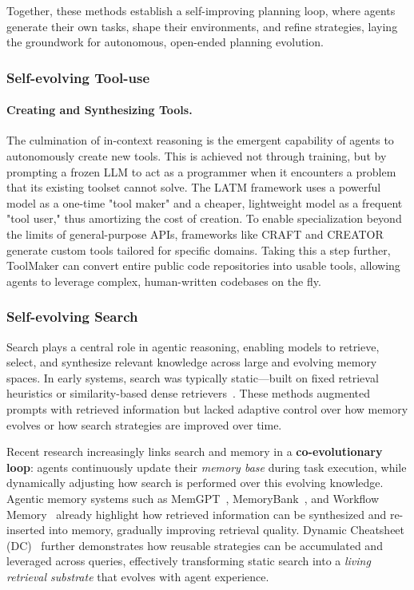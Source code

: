 Together, these methods establish a self-improving planning loop, where agents generate their own tasks, shape their environments, and refine strategies, laying the groundwork for autonomous, open-ended planning evolution.

\subsubsection{Self-evolving Tool-use}

\paragraph{Creating and Synthesizing Tools.}
The culmination of in-context reasoning is the emergent capability of agents to autonomously create new tools. This is achieved not through training, but by prompting a frozen LLM to act as a programmer when it encounters a problem that its existing toolset cannot solve.
The LATM framework \cite{cai2024large} uses a powerful model as a one-time "tool maker" and a cheaper, lightweight model as a frequent "tool user," thus amortizing the cost of creation. 
To enable specialization beyond the limits of general-purpose APIs, frameworks like CRAFT \cite{yuan2024craft} and CREATOR \cite{qian-etal-2023-creator} generate custom tools tailored for specific domains. Taking this a step further, ToolMaker \cite{wölflein2025llmagentsmakingagent} can convert entire public code repositories into usable tools, allowing agents to leverage complex, human-written codebases on the fly.



\subsubsection{Self-evolving Search}

Search plays a central role in agentic reasoning, enabling models to retrieve, select, and synthesize relevant knowledge across large and evolving memory spaces. In early systems, search was typically static—built on fixed retrieval heuristics or similarity-based dense retrievers~\cite{lewis2020retrieval,asai2023self,Zhong2023MemoryBankEL,Packer2023MemGPTTL}. These methods augmented prompts with retrieved information but lacked adaptive control over how memory evolves or how search strategies are improved over time.

Recent research increasingly links search and memory in a \textbf{co-evolutionary loop}: agents continuously update their \emph{memory base} during task execution, while dynamically adjusting how search is performed over this evolving knowledge. Agentic memory systems such as MemGPT~\cite{Packer2023MemGPTTL}, MemoryBank~\cite{Zhong2023MemoryBankEL}, and Workflow Memory~\cite{Wang2024AgentWM} already highlight how retrieved information can be synthesized and re-inserted into memory, gradually improving retrieval quality. Dynamic Cheatsheet (DC)~\cite{suzgun2025dynamic} further demonstrates how reusable strategies can be accumulated and leveraged across queries, effectively transforming static search into a \emph{living retrieval substrate} that evolves with agent experience.


